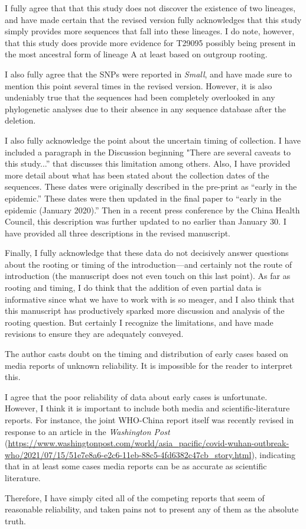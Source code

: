\documentclass[11pt, oneside]{article}   	%
\newcommand{\response}[1]{{\color{black}#1}}
\begin{document}
\response{I fully agree that that this study does not discover the existence of two lineages, and have made certain that the revised version fully acknowledges that this study simply provides more sequences that fall into these lineages.
I do note, however, that this study does provide more evidence for T29095 possibly being present in the most ancestral form of lineage A at least based on outgroup rooting.

I also fully agree that the SNPs were reported in \textit{Small}, and have made sure to mention this point several times in the revised version.
However, it is also undeniably true that the sequences had been completely overlooked in any phylogenetic analyses due to their absence in any sequence database after the deletion.

I also fully acknowledge the point about the uncertain timing of collection.
I have included a paragraph in the Discussion beginning "There are several caveats to this study...'' that discusses this limitation among others.
Also, I have provided more detail about what has been stated about the collection dates of the sequences.
These dates were originally described in the pre-print as ``early in the epidemic.''
These dates were then updated in the final paper to ``early in the epidemic (January 2020).''
Then in a recent press conference by the China Health Council, this description was further updated to no earlier than January 30.
I have provided all three descriptions in the revised manuscript.

Finally, I fully acknowledge that these data do not decisively answer questions about the rooting or timing of the introduction---and certainly not the route of introduction (the manuscript does not even touch on this last point).
As far as rooting and timing, I do think that the addition of even partial data is informative since what we have to work with is so meager, and I also think that this manuscript has productively sparked more discussion and analysis of the rooting question.
But certainly I recognize the limitations, and have made revisions to ensure they are adequately conveyed.}

The author casts doubt on the timing and distribution of early cases based on media reports of unknown reliability. It is impossible for the reader to interpret this.

\response{I agree that the poor reliability of data about early cases is unfortunate.
However, I think it is important to include both media and scientific-literature reports.
For instance, the joint WHO-China report itself was recently revised in response to an article in the \textit{Washington Post} (\url{https://www.washingtonpost.com/world/asia_pacific/covid-wuhan-outbreak-who/2021/07/15/51e7e8a6-e2c6-11eb-88c5-4fd6382c47cb_story.html}), indicating that in at least some cases media reports can be as accurate as scientific literature.

Therefore, I have simply cited all of the competing reports that seem of reasonable reliability, and taken pains not to present any of them as the absolute truth.}
\end{document}
